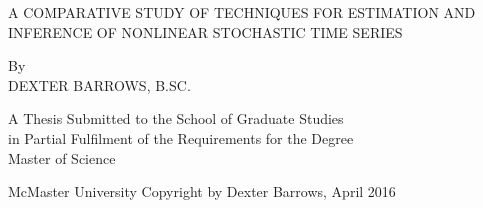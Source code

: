 \newpage
\thispagestyle{empty}
\centering
\null

\vfill

\uppercase{A Comparative Study of Techniques for Estimation and Inference of Nonlinear Stochastic Time Series}

\vspace{3cm}

By \\
\uppercase{Dexter Barrows}, B.SC.

\vspace{3cm}


A Thesis Submitted to the School of Graduate Studies \\
in Partial Fulfilment of the Requirements for the Degree\\
Master of Science

\vspace{2cm}

McMaster University \textcopyright Copyright by Dexter Barrows, April 2016

\vfill